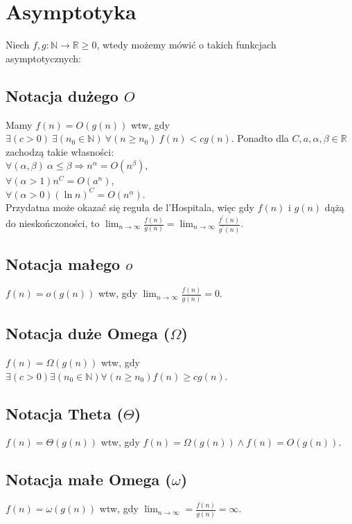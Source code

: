 \section{Asymptotyka}
Niech $f, g : \mathbb{N} \to \mathbb{R} \geq 0$, wtedy możemy mówić o takich
funkcjach asymptotycznych:

\subsection*{Notacja dużego $O$}
Mamy ${f(n) = O(g(n))}$ wtw, gdy
${\exists (c > 0)} \ {\exists (n_0 \in \mathbb{N})} \ {\forall (n \geq n_0)} \
{f(n) < cg(n)}$. Ponadto dla ${C, a, \alpha, \beta \in \mathbb{R}}$ zachodzą takie
własności: \\
$\forall (\alpha, \beta) \ \alpha \leq \beta \Rightarrow n^\alpha = O(n^\beta)$, \\
$\forall (\alpha > 1) n^C = O(a^n)$, \\
$\forall (\alpha > 0) (\ln n)^C = O(n^\alpha)$. \\
Przydatna może okazać się reguła de l'Hospitala, więc gdy $f(n)$ i $g(n)$ dążą do
nieskończoności, to ${\lim_{n \to \infty} \frac{f(n)}{g(n)}} = 
{\lim_{n \to \infty} \frac{f^\prime (n)}{g^\prime (n)}}$.

\subsection*{Notacja małego $o$}
${f(n) = o(g(n))}$ wtw, gdy ${\lim_{n \to \infty} \frac{f(n)}{g(n)} = 0}$.

\subsection*{Notacja duże Omega ($\Omega$)}
$f(n) = \Omega(g(n))$ wtw, gdy ${\exists (c > 0)} {\exists (n_0 \in \mathbb{N})} 
{\forall (n \geq n_0)}  {f(n) \geq cg(n)}$.

\subsection*{Notacja Theta ($\Theta$)}
$f(n) = \Theta(g(n))$ wtw, gdy ${f(n) = \Omega(g(n))} \wedge {f(n) = O(g(n))}$.

\subsection*{Notacja małe Omega ($\omega$)}
$f(n) = \omega(g(n))$ wtw, gdy ${\lim_{n \to \infty} = \frac{f(n)}{g(n)} = \infty}$.